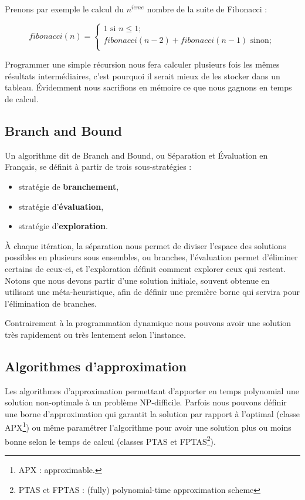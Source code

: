 Prenons par exemple le calcul du $n^{i\grave{e}me}$ nombre de la suite
de Fibonacci :

\begin{equation}
fibonacci(n) = 
\begin{cases}
1 \text{ si } n \leq 1; \\
fibonacci(n-2) + fibonacci(n-1) \text{ sinon};\\
\end{cases}
\end{equation}

Programmer une simple récursion nous fera calculer plusieurs fois les
mêmes résultats intermédiaires, c'est pourquoi il serait mieux de les
stocker dans un tableau. Évidemment nous sacrifions en mémoire ce que
nous gagnons en temps de calcul.


\subsection{Branch and Bound}
Un algorithme dit de Branch and Bound, ou Séparation et Évaluation en Français, se définit à partir de trois sous-stratégies :

\begin{itemize}
\item stratégie de \textbf{branchement},
\item stratégie d'\textbf{évaluation},
\item stratégie d'\textbf{exploration}.
\end{itemize}

À chaque itération, la séparation nous permet de diviser l'espace des
solutions possibles en plusieurs sous ensembles, ou branches,
l'évaluation permet d'éliminer certains de ceux-ci, et l'exploration
définit comment explorer ceux qui restent. Notons que nous devons
partir d'une solution initiale, souvent obtenue en utilisant une
méta-heuristique, afin de définir une première borne qui servira pour
l'élimination de branches.

Contrairement à la programmation dynamique nous pouvons avoir une
solution très rapidement ou très lentement selon l'instance.

\subsection{Algorithmes d'approximation}
Les algorithmes d'approximation permettant d'apporter en temps
polynomial une solution non-optimale à un problème
NP-difficile. Parfois nous pouvons définir une borne d'approximation
qui garantit la solution par rapport à l'optimal (classe
APX\footnote{APX : approximable. }) ou même paramétrer l'algorithme
pour avoir une solution plus ou moins bonne selon le temps de calcul
(classes PTAS et FPTAS\footnote{ PTAS et FPTAS : (fully)
  polynomial-time approximation scheme}).
